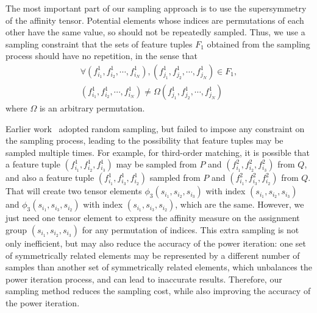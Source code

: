 The most important part of our sampling approach is to use the supersymmetry of the affinity tensor. Potential elements whose indices are permutations of each other
have the same value, so should not be repeatedly sampled.
Thus, we use a sampling constraint that the sets of feature tuples $F_1$ obtained from the sampling process should have no repetition, in the sense that
\begin{eqnarray}
\label{equ:noredun2}
\forall (f_{i_1}^1,f_{i_2}^1,\cdots,f_{i_N}^1),(f_{j_1}^1,f_{j_2}^1,\cdots,f_{j_N}^1) \in F_1,\nonumber\\ (f_{i_1}^1,f_{i_2}^1,\cdots,f_{i_N}^1)\neq\Omega(f_{j_1}^1,f_{j_2}^1,\cdots,f_{j_N}^1)
\end{eqnarray}
where $\Omega$ is an arbitrary permutation.

Earlier work~\cite{Duchenne09,Zass08} adopted random sampling,
but failed to impose any constraint on the sampling process,
leading to the possibility that feature tuples may be sampled multiple times.
For example, for third-order matching, it is possible that a feature tuple $(f_{i_1}^1, f_{i_2}^1, f_{i_3}^1)$ may be sampled from $P$ and $(f_{i_1}^2, f_{i_2}^2, f_{i_3}^2)$ from $Q$, 
and also a feature tuple $(f_{i_1}^1, f_{i_3}^1, f_{i_2}^1)$ sampled from $P$ and $(f_{i_1}^2, f_{i_3}^2, f_{i_2}^2)$ from $Q$. That will create two tensor elements $\phi_3(s_{i_1}, s_{i_2}, s_{i_3})$ with index $(s_{i_1}, s_{i_2}, s_{i_3})$ and $\phi_3(s_{i_1}, s_{i_3}, s_{i_2})$ with index $(s_{i_1}, s_{i_3}, s_{i_2})$, which are the same. However, we just need one tensor element to express the affinity measure on the assignment group $(s_{i_1}, s_{i_2}, s_{i_3})$ for any permutation of indices.
This extra sampling is not only inefficient, but may also reduce the accuracy of the power iteration: one set of symmetrically related elements  may be represented by a different number of samples than another set of  symmetrically related elements, which unbalances the power iteration process, and can lead to inaccurate results.
Therefore, our sampling method reduces the sampling cost, while also improving the accuracy of the power iteration.
